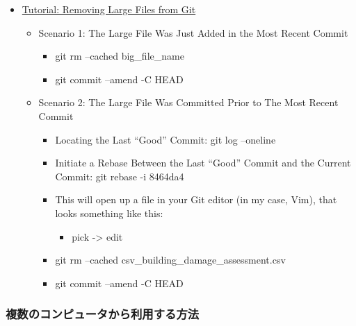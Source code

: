\documentclass[
]{bxjsbook}
\providecommand{\tightlist}{%
  \setlength{\itemsep}{0pt}\setlength{\parskip}{0pt}}
\theoremstyle{definition}
\theoremstyle{definition}
\theoremstyle{definition}
\theoremstyle{definition}
\theoremstyle{remark}
\begin{document}
\begin{itemize}
\tightlist
\item
  \href{https://medium.com/analytics-vidhya/tutorial-removing-large-files-from-git-78dbf4cf83a}{Tutorial: Removing Large Files from Git}

  \begin{itemize}
  \tightlist
  \item
    Scenario 1: The Large File Was Just Added in the Most Recent Commit

    \begin{itemize}
    \tightlist
    \item
      git rm --cached big\_file\_name
    \item
      git commit --amend -C HEAD
    \end{itemize}
  \item
    Scenario 2: The Large File Was Committed Prior to The Most Recent Commit

    \begin{itemize}
    \tightlist
    \item
      Locating the Last ``Good'' Commit: git log --oneline
    \item
      Initiate a Rebase Between the Last ``Good'' Commit and the Current Commit: git rebase -i 8464da4
    \item
      This will open up a file in your Git editor (in my case, Vim), that looks something like this:

      \begin{itemize}
      \tightlist
      \item
        pick -\textgreater{} edit
      \end{itemize}
    \item
      git rm --cached csv\_building\_damage\_assessment.csv
    \item
      git commit --amend -C HEAD
    \end{itemize}
  \end{itemize}
\end{itemize}

\hypertarget{ux8907ux6570ux306eux30b3ux30f3ux30d4ux30e5ux30fcux30bfux304bux3089ux5229ux7528ux3059ux308bux65b9ux6cd5}{%
\subsubsection{複数のコンピュータから利用する方法}\label{ux8907ux6570ux306eux30b3ux30f3ux30d4ux30e5ux30fcux30bfux304bux3089ux5229ux7528ux3059ux308bux65b9ux6cd5}}
\end{document}
